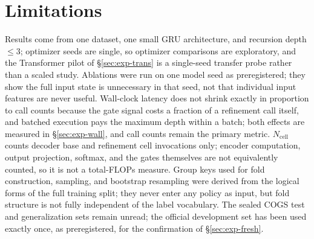 ﻿\documentclass[11pt]{article}
\begin{document}
\section*{Limitations}
Results come from one dataset, one small GRU architecture, and recursion depth $\leq 3$; optimizer seeds are single, so optimizer comparisons are exploratory, and the Transformer pilot of \S\ref{sec:exp-trans} is a single-seed transfer probe rather than a scaled study. Ablations were run on one model seed as preregistered; they show the full input state is unnecessary in that seed, not that individual input features are never useful. Wall-clock latency does not shrink exactly in proportion to call counts because the gate signal costs a fraction of a refinement call itself, and batched execution pays the maximum depth within a batch; both effects are measured in \S\ref{sec:exp-wall}, and call counts remain the primary metric. $N_{\mathrm{cell}}$ counts decoder base and refinement cell invocations only; encoder computation, output projection, softmax, and the gates themselves are not equivalently counted, so it is not a total-FLOPs measure. Group keys used for fold construction, sampling, and bootstrap resampling were derived from the logical forms of the full training split; they never enter any policy as input, but fold structure is not fully independent of the label vocabulary. The sealed COGS test and generalization sets remain unread; the official development set has been used exactly once, as preregistered, for the confirmation of \S\ref{sec:exp-fresh}.


\end{document}
